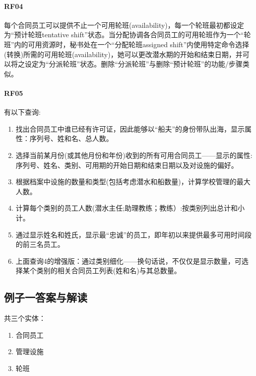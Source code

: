 \hypertarget{rf04}{%
\paragraph{RF04}\label{rf04}}

每个合同员工可以提供不止一个可用轮班(availability)，每一个轮班最初都设定为``预计轮班tentative
shift''状态。当分配协调各合同员工的可用轮班作为一个``轮班''内的可用资源时，秘书处在一个``分配轮班assigned
shift''内使用特定命令选择(转换)所需的可用轮班(availability)，她可以更改潜水期的开始和结束日期，并可以将之设定为``分派轮班''状态。删除``分派轮班''与删除``预计轮班''的功能/步骤类似。

\hypertarget{rf05}{%
\paragraph{RF05}\label{rf05}}

有以下查询:

\begin{enumerate}
\tightlist
\item
  找出合同员工中谁已经有许可证，因此能够以``船夫''的身份带队出海，显示属性：序列号、姓和名、总人数。
\item
  选择当前某月份(或其他月份和年份)收到的所有可用合同员工------显示的属性:序列号、姓名、类别、可用期的开始日期和结束日期以及对设施的偏好。
\item
  根据档案中设施的数量和类型(包括考虑潜水和船数量)，计算学校管理的最大人数。
\item
  计算每个类别的员工人数(潜水主任;助理教练；教练）:按类别列出总计和小计。
\item
  通过显示姓名和姓氏，显示最``忠诚''的员工，即年初以来提供最多可用时间段的前三名员工。
\item
  上面查询4的增强版：通过类别细化------换句话说，不仅仅是显示数量，可选择某个类别的相关合同员工列表(姓和名)与其总数量。
\end{enumerate}

\hypertarget{ux4f8bux5b50ux4e00ux7b54ux6848ux4e0eux89e3ux8bfb}{%
\subsection{例子一答案与解读}\label{ux4f8bux5b50ux4e00ux7b54ux6848ux4e0eux89e3ux8bfb}}

共三个实体：

\begin{enumerate}
\tightlist
\item
  合同员工
\item
  管理设施
\item
  轮班
\end{enumerate}

